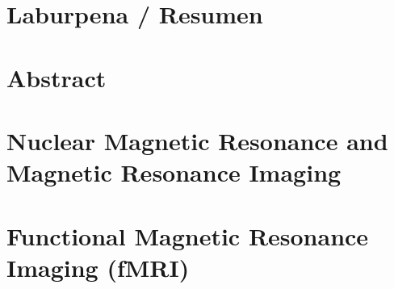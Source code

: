 \documentclass[a4page, 11pt, showtrims]{memoir}
\title{\izenburua}
\author{\egilea}
\date{\data}
\begin{document}
\SingleSpacing




\cleardoublepage
\frontmatter



%


\chapter*{Laburpena / Resumen}

\cleardoublepage


\chapter*{Abstract}

\cleardoublepage



\tableofcontents
\clearpage
\listoffigures
\clearpage
\listoftables
\clearpage



\cleardoublepage
\mainmatter
\pagestyle{ruled}




\chapter{Nuclear Magnetic Resonance and Magnetic Resonance Imaging}

\label{chap:MRI}
\cleardoublepage
\chapter{Functional Magnetic Resonance Imaging (fMRI)}

\label{chap:fMRI}
\cleardoublepage
\end{document}
